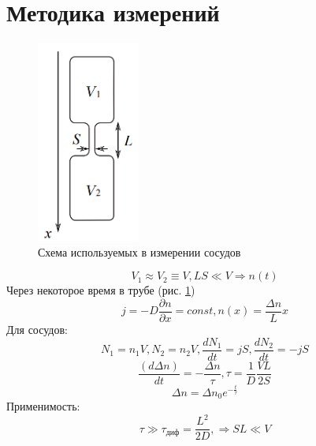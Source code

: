\documentclass[a4paper,12pt]{article} %
\begin{document}
\section{Методика измерений}
\begin{figure}[h!]
\begin{center}
\includegraphics[width=0.3\textwidth]{Схема}
\end{center}
\caption{Схема используемых в измерении сосудов} \label{схема}
\end{figure}
\begin{equation}
V_1 \approx V_2\equiv V, LS\ll V \Rightarrow n(t)
\end{equation}
Через некоторое время в трубе (рис. \ref{схема})
\begin{equation}
j = -D\frac{\partial n}{\partial x} = const, n(x) = \frac{\Delta n}{L}x
\end{equation}
Для сосудов:
\begin{equation}
N_1=n_1V, N_2=n_2V, \frac{dN_1}{dt}=jS, \frac{dN_2}{dt}=-jS
\end{equation}
\begin{equation}
\frac{(d\Delta n)}{dt} =- \frac{\Delta n}{\tau}, \tau = \frac{1}{D}\frac{VL}{2S}
\end{equation}
\begin{equation}
\Delta n = \Delta n_0 e^{-\frac{t}{\tau}}
\end{equation}
Применимость: 
\begin{equation}
\tau \gg \tau_{\text{диф}}=\frac{L^2}{2D}, \Rightarrow SL\ll V
\end{equation}
\end{document}
